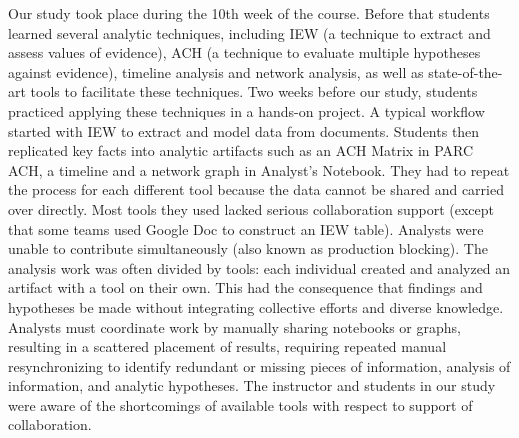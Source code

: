 Our study took place during the 10th week of the course. Before that students learned several analytic techniques, including IEW (a
technique to extract and assess values of evidence), ACH (a technique to
evaluate multiple hypotheses against evidence), timeline analysis and
network analysis, as well as state-of-the-art tools to facilitate these
techniques. Two weeks before our study, students practiced applying
these techniques in a hands-on project. A typical workflow started with
IEW to extract and model data from documents. Students then replicated
key facts into analytic artifacts such as an ACH Matrix in PARC ACH, a
timeline and a network graph in Analyst's Notebook. They had to repeat
the process for each different tool because the data cannot be shared
and carried over directly. Most tools they used lacked serious
collaboration support (except that some teams used Google Doc to
construct an IEW table). Analysts were unable to contribute
simultaneously (also known as production blocking). The analysis work
was often divided by tools: each individual created and analyzed an
artifact with a tool on their own. This had the consequence that
findings and hypotheses be made without integrating collective efforts
and diverse knowledge. Analysts must coordinate work by manually sharing
notebooks or graphs, resulting in a scattered placement of results,
requiring repeated manual resynchronizing to identify redundant or
missing pieces of information, analysis of information, and analytic
hypotheses. The instructor and students in our study were aware of the
shortcomings of available tools with respect to support of
collaboration.